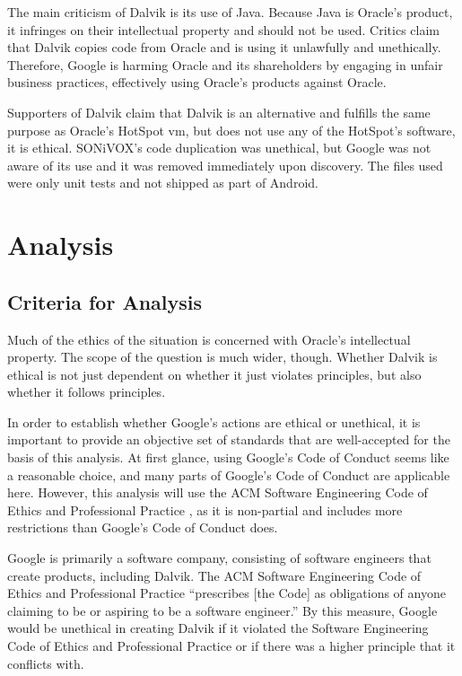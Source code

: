 \documentclass[11pt]{article}
\begin{document}
\begin{multicols}{2}
The main criticism of Dalvik is its use of Java.  Because Java is Oracle's
product, it infringes on their intellectual property and should not be used.
Critics claim that Dalvik copies code from Oracle and is using it unlawfully and
unethically.  Therefore, Google is harming Oracle and its shareholders by
engaging in unfair business practices, effectively using Oracle's products
against Oracle.

Supporters of Dalvik claim that Dalvik is an alternative and fulfills the same
purpose as Oracle's HotSpot \gls{vm}, but does not use any of the HotSpot's
software, it is ethical.  SONiVOX's code duplication was unethical, but Google
was not aware of its use and it was removed immediately upon discovery.  The
files used were only unit tests and not shipped as part of Android.



\section{Analysis} %
\label{sec:analysis}

\subsection{Criteria for Analysis} %
\label{sub:criteria}

Much of the ethics of the situation is concerned with Oracle's intellectual
property.  The scope of the question is much wider, though.  Whether Dalvik is
ethical is not just dependent on whether it just violates principles, but also
whether it follows principles.

In order to establish whether Google's actions are ethical or unethical, it is
important to provide an objective set of standards that are well-accepted for
the basis of this analysis.  At first glance, using Google's Code of Conduct
\cite{google-conduct} seems like a reasonable choice, and many parts of Google's
Code of Conduct are applicable here.  However, this analysis will use the ACM
Software Engineering Code of Ethics and Professional Practice \cite{secode}, as
it is non-partial and includes more restrictions than Google's Code of Conduct
does.

Google is primarily a software company, consisting of software engineers that
create products, including Dalvik.  The ACM Software Engineering Code of Ethics
and Professional Practice ``prescribes [the Code] as obligations of anyone
claiming to be or aspiring to be a software engineer.'' \cite{secode} By this
measure, Google would be unethical in creating Dalvik if it violated the
Software Engineering Code of Ethics and Professional Practice \cite{secode} or
if there was a higher principle that it conflicts with.


\end{multicols}
\end{document}
